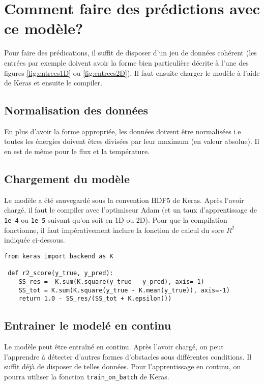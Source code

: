 

\chapter{Comment faire des prédictions avec ce modèle?} %

\label{AppendixB} %
Pour faire des prédications, il suffit de disposer d'un jeu de données cohérent (les entrées par exemple doivent avoir la forme bien particulière décrite à l'une des figures \ref{fig:entrees1D} ou \ref{fig:entrees2D}). Il faut ensuite charger le modèle à l'aide de Keras et ensuite le compiler.

\section{Normalisation des données}
En plus d'avoir la forme appropriée, les données doivent être normalisées i.e toutes les énergies doivent êtres divisées par leur maximum (en valeur absolue). Il en est de même pour le flux et la température.

\section{Chargement du modèle}
Le modèle a été sauvegardé sous la convention HDF5 de Keras. Après l'avoir chargé, il faut le compiler avec l'optimiseur Adam (et un taux d'apprentissage de \verb|1e-4| ou \verb|1e-5| suivant qu'on soit en 1D ou 2D). Pour que la compilation fonctionne, il faut impérativement inclure la fonction de calcul du sore $R^2$ indiquée ci-dessous.

\begin{verbatim}
from keras import backend as K

 def r2_score(y_true, y_pred):
    SS_res =  K.sum(K.square(y_true - y_pred), axis=-1) 
    SS_tot = K.sum(K.square(y_true - K.mean(y_true)), axis=-1)
    return 1.0 - SS_res/(SS_tot + K.epsilon())
\end{verbatim}


\section{Entrainer le modelé en continu}
Le modèle peut être entraîné en continu. Après l'avoir chargé, on peut l'apprendre à détecter d'autres formes d'obstacles sous différentes conditions. Il suffit déjà de disposer de telles données. Pour l'apprentissage en continu, on pourra utiliser la fonction \verb|train_on_batch| de Keras.

